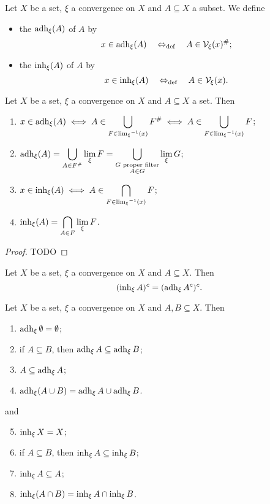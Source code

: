 \begin{definition}
Let $X$ be a set, $\xi$ a convergence on $X$ and $A\subseteq X$ a subset. We define
\begin{itemize}
\item the  $\operatorname{adh}_\xi(A)$ of $A$ by
\[ x\in \operatorname{adh}_\xi(A) \quad\Leftrightarrow_{\text{def}}\quad A\in \mathcal{V}_\xi(x)^{\mathrel{\#}}; \]
\item the  $\operatorname{inh}_\xi(A)$ of $A$ by
\[ x\in \operatorname{inh}_\xi(A) \quad\Leftrightarrow_{\text{def}}\quad A\in \mathcal{V}_\xi(x). \]
\end{itemize}
\end{definition}

\begin{proposition}
Let $X$ be a set, $\xi$ a convergence on $X$ and $A \subseteq X$ a set. Then
\begin{enumerate}
\item $\displaystyle x\in \operatorname{adh}_\xi(A) \iff A \in \bigcup_{F\in {\lim_\xi}^{-1}(x)} F^{\mathrel{\#}} \iff A \in \bigcup_{F\in {\lim_\xi}^{-1}(x)} F$;
\item $\displaystyle \operatorname{adh}_\xi(A) = \bigcup_{A \in F^{\mathrel{\#}}}\lim_\xi F = \bigcup_{\substack{\text{$G$ proper filter} \\ A\in G}} \lim_\xi G$;
\item $\displaystyle x\in \operatorname{inh}_\xi(A) \iff A \in \bigcap_{F\in {\lim_\xi}^{-1}(x)} F$;
\item $\displaystyle \operatorname{inh}_\xi(A) = \bigcap_{A \in F}\lim_\xi F$.
\end{enumerate}
\end{proposition}
\begin{proof}
TODO
\end{proof}
\begin{corollary}
Let $X$ be a set, $\xi$ a convergence on $X$ and $A \subseteq X$. Then
\[ (\operatorname{inh}_\xi A)^c = (\operatorname{adh}_\xi A^c)^c. \]
\end{corollary}
\begin{corollary}
Let $X$ be a set, $\xi$ a convergence on $X$ and $A,B \subseteq X$. Then
\begin{enumerate}
\item $\operatorname{adh}_\xi \emptyset = \emptyset$;
\item if $A \subseteq B$, then $\operatorname{adh}_\xi A \subseteq \operatorname{adh}_\xi B$;
\item $A\subseteq \operatorname{adh}_\xi A$;
\item $\operatorname{adh}_\xi(A\cup B) = \operatorname{adh}_\xi A \cup \operatorname{adh}_\xi B$.
\end{enumerate}
and
\begin{enumerate} \setcounter{enumi}{4}
\item $\operatorname{inh}_\xi X = X$;
\item if $A \subseteq B$, then $\operatorname{inh}_\xi A \subseteq \operatorname{inh}_\xi B$;
\item $\operatorname{inh}_\xi A \subseteq A$;
\item $\operatorname{inh}_\xi(A\cap B) = \operatorname{inh}_\xi A \cap \operatorname{inh}_\xi B$.
\end{enumerate}
\end{corollary}

